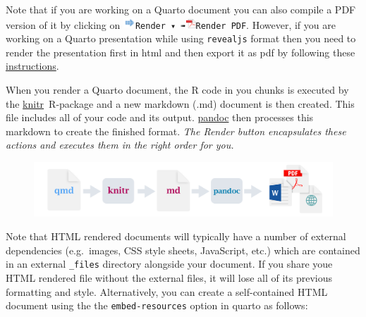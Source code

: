 \documentclass[
  letterpaper,
  DIV=11,
  numbers=noendperiod]{scrartcl}
\begin{document}
\begin{tcolorbox}[enhanced jigsaw, colback=white, toprule=.15mm, arc=.35mm, colbacktitle=quarto-callout-note-color!10!white, titlerule=0mm, colframe=quarto-callout-note-color-frame, title=\textcolor{quarto-callout-note-color}{\faInfo}\hspace{0.5em}{Note}, bottomtitle=1mm, toptitle=1mm, coltitle=black, rightrule=.15mm, opacityback=0, bottomrule=.15mm, breakable, leftrule=.75mm, left=2mm, opacitybacktitle=0.6]

Note that if you are working on a Quarto document you can also compile a
PDF version of it by clicking on
\includegraphics[width=0.17708in,height=0.17708in]{images/rstudio-render-button.png}\texttt{Render\ ▾\ ➠}\includegraphics[width=0.14583in,height=\textheight]{images/renderpdf.png}\texttt{Render\ PDF}.
However, if you are working on a Quarto presentation while using
\texttt{revealjs} format then you need to render the presentation first
in html and then export it as pdf by following these
\href{https://quarto.org/docs/presentations/revealjs/presenting.html\#print-to-pdf}{instructions}.

\end{tcolorbox}

When you render a Quarto document, the R code in you chunks is executed
by the \href{http://yihui.name/knitr/}{knitr}~R-package and a new
markdown (.md) document is then created. This file includes all of your
code and its output. \href{http://pandoc.org/}{pandoc} then processes
this markdown to create the finished format. \emph{The Render button
encapsulates these actions and executes them in the right order for
you.}

\begin{figure}

{\centering \includegraphics{images/rstudio-qmd-how-it-works.png}

}

\end{figure}

Note that HTML rendered documents will typically have a number of
external dependencies (e.g.~images, CSS style sheets, JavaScript, etc.)
which are contained in an external \texttt{\_files} directory alongside
your document. If you share youe HTML rendered file without the external
files, it will lose all of its previous formatting and style.
Alternatively, you can create a self-contained HTML document using the
the \texttt{embed-resources} option in quarto as follows:
\end{document}
